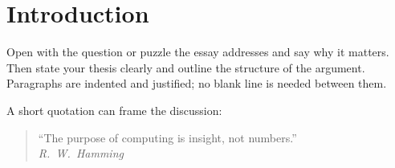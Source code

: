 \section{Introduction}

Open with the question or puzzle the essay addresses and say why it matters. Then state your thesis
clearly and outline the structure of the argument. Paragraphs are indented and justified; no blank line
is needed between them.

A short quotation can frame the discussion:
\begin{quote}
  ``The purpose of computing is insight, not numbers.''\\
  \hfill\emph{R.~W.~Hamming}
\end{quote}
